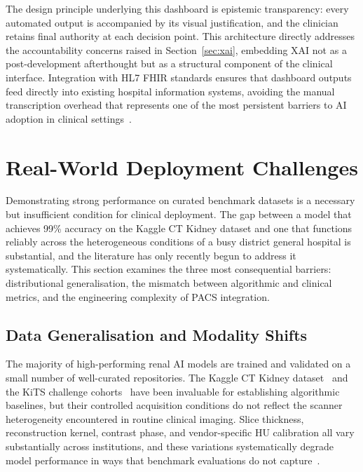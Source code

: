 \documentclass[pdflatex,sn-mathphys-num]{sn-jnl}%
\begin{document}
The design principle underlying this dashboard is epistemic transparency: every automated output is accompanied by its visual justification, and the clinician retains final authority at each decision point. This architecture directly addresses the accountability concerns raised in Section~\ref{sec:xai}, embedding XAI not as a post-development afterthought but as a structural component of the clinical interface. Integration with HL7 FHIR standards ensures that dashboard outputs feed directly into existing hospital information systems, avoiding the manual transcription overhead that represents one of the most persistent barriers to AI adoption in clinical settings~\cite{liang2025multicenter}.


\section{Real-World Deployment Challenges}
\label{sec:challenges}

Demonstrating strong performance on curated benchmark datasets is a necessary but insufficient condition for clinical deployment. The gap between a model that achieves 99\% accuracy on the Kaggle CT Kidney dataset and one that functions reliably across the heterogeneous conditions of a busy district general hospital is substantial, and the literature has only recently begun to address it systematically. This section examines the three most consequential barriers: distributional generalisation, the mismatch between algorithmic and clinical metrics, and the engineering complexity of PACS integration.

\subsection{Data Generalisation and Modality Shifts}
\label{subsec:generalization_shifts}

The majority of high-performing renal AI models are trained and validated on a small number of well-curated repositories. The Kaggle CT Kidney dataset~\cite{ahmed2021ct, hossain2025detection} and the KiTS challenge cohorts~\cite{heller2023kits21} have been invaluable for establishing algorithmic baselines, but their controlled acquisition conditions do not reflect the scanner heterogeneity encountered in routine clinical imaging. Slice thickness, reconstruction kernel, contrast phase, and vendor-specific HU calibration all vary substantially across institutions, and these variations systematically degrade model performance in ways that benchmark evaluations do not capture~\cite{abdelrahman2022deep}. 
\end{document}

